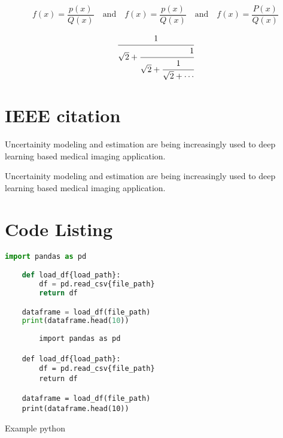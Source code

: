 \documentclass{report}
\begin{document}
 \[f(x)=\frac{p(x)}{Q(x)}\quad \textrm{and} \quad \textstyle 
 f(x)=\frac{p(x)}{Q(x)}\quad \textrm{and} \quad \scriptstyle f(x)= \frac{P(x)}{Q(x)} 
 \]
   
 \[
  \cfrac[|]{1}{\sqrt{2} +
    \cfrac[r]{1}{\sqrt{2}+
    \cfrac{1}{\sqrt{2}+\dotsb }}}
 \]
 \section{IEEE citation}

Uncertainity modeling and estimation are being increasingly used to deep learning based medical imaging application. \cite{bharati2020deep,jogin2018feature, nasteski2017overview}

Uncertainity modeling and estimation are being increasingly used to deep learning based medical imaging application. \cite{jogin2018feature,reich2009rich}




\lstlistoflistings
\newpage
\section{Code Listing}
\begin{lstlisting}[language=python, caption=Python example]
    import pandas as pd

    def load_df{load_path}:
        df = pd.read_csv{file_path}
        return df

    dataframe = load_df(file_path)
    print(dataframe.head(10))    
\end{lstlisting}

\listoflistings
\newpage
\begin{listing}
    \begin{verbatim}
        import pandas as pd

    def load_df{load_path}:
        df = pd.read_csv{file_path}
        return df

    dataframe = load_df(file_path)
    print(dataframe.head(10))
    \end{verbatim}
    \caption{Example python}
    \label{listing:1}
\end{listing}
\end{document}
